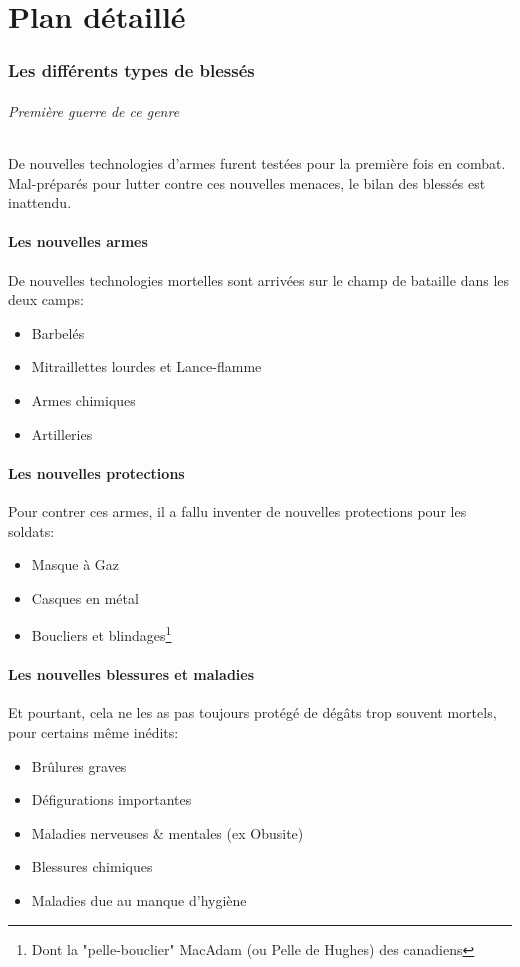 \documentclass[a4paper, BCOR=0mm, fontsize=12pt, titlepage=firstiscover]{scrreprt}
\begin{document}
	
	\part*{Plan détaillé}
	\newpage
	\section{Les différents types de blessés}
		\paragraph{Première guerre de ce genre}
		De nouvelles technologies d'armes furent testées pour la première fois en combat.
		Mal-préparés pour lutter contre ces nouvelles menaces, le bilan des blessés est inattendu.
	
		\subsection{Les nouvelles armes}
			De nouvelles technologies mortelles sont arrivées sur le champ de bataille dans les deux camps:
			\begin{itemize}
				\item Barbelés
				\item Mitraillettes lourdes et Lance-flamme
				\item Armes chimiques
				\item Artilleries
			\end{itemize}
		\subsection{Les nouvelles protections}
			Pour contrer ces armes, il a fallu inventer de nouvelles protections pour les soldats:
			\begin{itemize}
				\item Masque à Gaz
				\item Casques en métal
				\item Boucliers et blindages\footnote{Dont la "pelle-bouclier" MacAdam (ou Pelle de Hughes) des canadiens}
			\end{itemize}
		\subsection{Les nouvelles blessures et maladies}
			Et pourtant, cela ne les as pas toujours protégé de dégâts trop souvent mortels, pour certains même inédits:
			\begin{itemize}
				\item Brûlures graves
				\item Défigurations importantes 
				\item Maladies nerveuses \& mentales (ex Obusite)
				\item Blessures chimiques
				\item Maladies due au manque d'hygiène
			\end{itemize}
	\newpage
	
\end{document}
